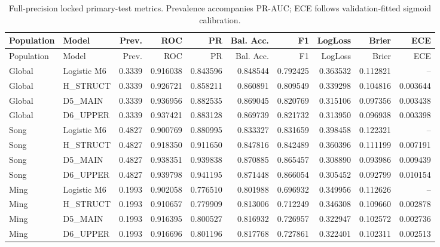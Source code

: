 \begin{longtable}{llrrrrrrrr}
\caption{Full-precision locked primary-test metrics. Prevalence accompanies PR-AUC; ECE follows validation-fitted sigmoid calibration.}\label{tab:app-metrics}\\
\toprule
Population & Model & Prev. & ROC & PR & Bal. Acc. & F1 & LogLoss & Brier & ECE \\
\midrule
\endfirsthead
\toprule
Population & Model & Prev. & ROC & PR & Bal. Acc. & F1 & LogLoss & Brier & ECE \\
\midrule
\endhead
Global & Logistic M6 & 0.3339 & 0.916038 & 0.843596 & 0.848544 & 0.792425 & 0.363532 & 0.112821 & -- \\
Global & H\_STRUCT & 0.3339 & 0.926721 & 0.858211 & 0.860891 & 0.809549 & 0.339298 & 0.104816 & 0.003644 \\
Global & D5\_MAIN & 0.3339 & 0.936956 & 0.882535 & 0.869045 & 0.820769 & 0.315106 & 0.097356 & 0.003438 \\
Global & D6\_UPPER & 0.3339 & 0.937421 & 0.883128 & 0.869739 & 0.821732 & 0.313950 & 0.096938 & 0.003398 \\
Song & Logistic M6 & 0.4827 & 0.900769 & 0.880995 & 0.833327 & 0.831659 & 0.398458 & 0.122321 & -- \\
Song & H\_STRUCT & 0.4827 & 0.918350 & 0.911650 & 0.847816 & 0.842489 & 0.360396 & 0.111199 & 0.007191 \\
Song & D5\_MAIN & 0.4827 & 0.938351 & 0.939838 & 0.870885 & 0.865457 & 0.308890 & 0.093986 & 0.009439 \\
Song & D6\_UPPER & 0.4827 & 0.939798 & 0.941195 & 0.871448 & 0.866054 & 0.305452 & 0.092799 & 0.010154 \\
Ming & Logistic M6 & 0.1993 & 0.902058 & 0.776510 & 0.801988 & 0.696932 & 0.349956 & 0.112626 & -- \\
Ming & H\_STRUCT & 0.1993 & 0.910657 & 0.779909 & 0.813006 & 0.712249 & 0.346308 & 0.109660 & 0.002878 \\
Ming & D5\_MAIN & 0.1993 & 0.916395 & 0.800527 & 0.816932 & 0.726957 & 0.322947 & 0.102572 & 0.002736 \\
Ming & D6\_UPPER & 0.1993 & 0.916696 & 0.801196 & 0.817768 & 0.727861 & 0.322401 & 0.102311 & 0.002513 \\
\bottomrule
\end{longtable}
